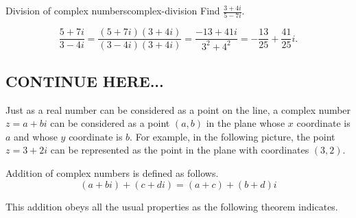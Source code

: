 \begin{example}{Division of complex numbers}{complex-division}
  Find $\displaystyle\frac{3+4i}{5-7i}$.
\end{example}

\begin{solution}
  \begin{equation*}
    \frac{5+7i}{3-4i}
    = \frac{(5+7i)(3+4i)}{(3-4i)(3+4i)}
    = \frac{-13+41i}{3^2+4^2}
    = -\frac{13}{25} + \frac{41}{25}i.
  \end{equation*}
\end{solution}

\subsection{CONTINUE HERE...}

Just as a real number can be considered as a point on the line, a
complex number $z = a + bi$ can be considered as a point $(
a,b) $ in the plane whose $x$ coordinate is $ a$ and whose $y$
coordinate is $b$. For example, in the following picture, the point $z
= 3+2i$ can be represented as the point in the plane with
coordinates $(3,2)$.

\begin{center}
\end{center}

Addition of complex numbers is defined as follows.
\begin{equation*}
  (a+bi) +(c+di) =(a+c) +(b+d)i
\end{equation*}

This addition obeys all the usual properties as the following theorem indicates.

